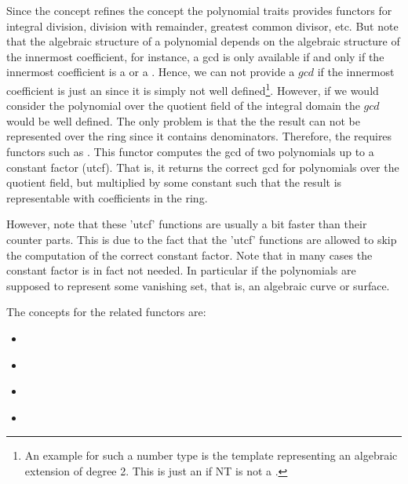 Since the concept  refines the concept 
 the polynomial traits provides functors for 
integral division, division with remainder, greatest common divisor, etc.
But note that the algebraic structure of a polynomial depends on the algebraic 
structure of the innermost coefficient, for instance, a gcd is only available 
if and only if the innermost coefficient is a  or a 
. Hence, we can not provide a $gcd$ if the 
innermost coefficient is just an  since it is simply 
not well defined\footnote{%
An example for such a number type is the template 
 representing an algebraic extension of 
degree 2. This is just an  if NT is not a . }.
% 
However, if we would consider the polynomial over the quotient field of the 
integral domain the $gcd$ would be well defined. The only problem is
that the the result can not be represented over the ring since it contains 
denominators.   
Therefore, the  requires functors such as 
. 
This functor computes the gcd of two polynomials up to a constant factor (utcf).
That is, it returns the correct gcd for polynomials over the quotient field, 
but multiplied by some constant such that the result is representable with 
coefficients in the ring. 

However, note that these 'utcf' functions are usually a bit faster than their 
counter parts. This is due to the fact that the 'utcf' functions are allowed 
to skip the computation of the correct constant factor.
Note that in many cases the constant factor is in fact not needed.
In particular if the polynomials are supposed to represent some vanishing set, 
that is, an algebraic curve or surface.  

The concepts for the related functors are: 
\begin{itemize}
\item {}\\     

\item {}\\        

\item {}
      \\
       
\item {}\\
\end{itemize}

